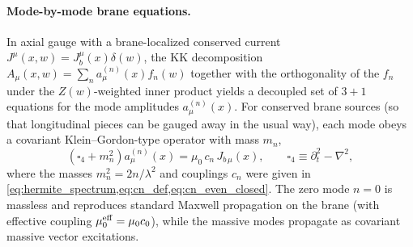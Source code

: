 \documentclass[11pt]{article}
\newcommand{\A}{A}
\newcommand{\J}{J}
\newcommand{\Z}{Z}
\newcommand{\lam}{\lambda}      %
\newcommand{\muo}{\mu_0}
\newcommand{\mueff}{\mu_0^{\rm eff}}
\begin{document}
\paragraph{Mode-by-mode brane equations.}
In axial gauge with a brane-localized conserved current
\(\J^\mu(x,w)=\J_b^\mu(x)\delta(w)\), the KK decomposition
\(\A_\mu(x,w)=\sum_n a^{(n)}_\mu(x)f_n(w)\) together with the orthogonality of the
\(f_n\) under the \(\Z(w)\)-weighted inner product yields a decoupled set of
\(3+1\) equations for the mode amplitudes \(a^{(n)}_\mu(x)\). For conserved brane
sources (so that longitudinal pieces can be gauged away in the usual way), each
mode obeys a covariant Klein--Gordon-type operator with mass \(m_n\),
\begin{equation}
  \left(\square_4 + m_n^2\right)a^{(n)}_\mu(x)
  = \muo\,c_n\,\J_{b\,\mu}(x),
  \qquad
  \square_4 \equiv \partial_t^2-\nabla^2,
  \label{eq:mode_wave_eq}
\end{equation}
where the masses \(m_n^2=2n/\lam^2\) and couplings \(c_n\) were given in
\cref{eq:hermite_spectrum,eq:cn_def,eq:cn_even_closed}. The zero mode \(n=0\) is
massless and reproduces standard Maxwell propagation on the brane (with effective
coupling \(\mueff=\muo c_0\)), while the massive modes propagate as covariant
massive vector excitations.
\end{document}
